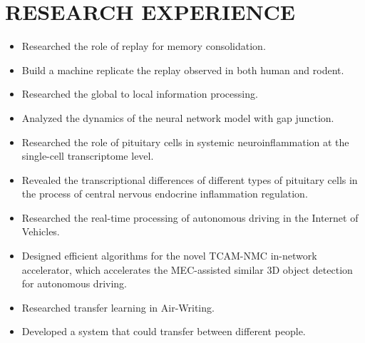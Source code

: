 \documentclass{resume}
\begin{document}
\section{{\bfseries RESEARCH EXPERIENCE}}
\begin{itemize}[parsep=0.2ex]
  \item Researched the role of replay for memory consolidation.
  \item Build a machine replicate the replay observed in both human and rodent.
\end{itemize}
\begin{itemize}[parsep=0.2ex]
  \item Researched the global to local information processing.
  \item Analyzed the dynamics of the neural network model with gap junction.
\end{itemize}
\begin{itemize}[parsep=0.2ex]
  \item Researched the role of pituitary cells in systemic neuroinflammation at the single-cell transcriptome level.
  \item Revealed the transcriptional differences of different types of pituitary cells in the process of central nervous endocrine inflammation regulation.
\end{itemize}
\begin{itemize}[parsep=0.2ex]
  \item Researched the real-time processing of autonomous driving in the Internet of Vehicles.
  \item Designed efficient algorithms for the novel TCAM-NMC in-network accelerator, which accelerates the MEC-assisted similar 3D object detection for autonomous driving.
\end{itemize}
\begin{itemize}[parsep=0.2ex]
  \item Researched transfer learning in Air-Writing.
  \item Developed a system that could transfer between different people.
\end{itemize}
\end{document}

